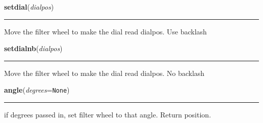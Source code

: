     \label{wheel:setdial}

    \vspace{0.5ex}

    \begin{boxedminipage}{\textwidth}

    \raggedright \textbf{setdial}(\textit{dialpos})

    \vspace{-1.5ex}

    \rule{\textwidth}{0.5\fboxrule}
    Move the filter wheel to make the dial read dialpos. Use backlash

    \vspace{1ex}

    \end{boxedminipage}

    \label{wheel:setdialnb}

    \vspace{0.5ex}

    \begin{boxedminipage}{\textwidth}

    \raggedright \textbf{setdialnb}(\textit{dialpos})

    \vspace{-1.5ex}

    \rule{\textwidth}{0.5\fboxrule}
    Move the filter wheel to make the dial read dialpos. No backlash

    \vspace{1ex}

    \end{boxedminipage}

    \label{wheel:angle}

    \vspace{0.5ex}

    \begin{boxedminipage}{\textwidth}

    \raggedright \textbf{angle}(\textit{degrees}=\texttt{None})

    \vspace{-1.5ex}

    \rule{\textwidth}{0.5\fboxrule}
    if degrees passed in, set filter wheel to that angle. Return position.

    \vspace{1ex}

    \end{boxedminipage}


